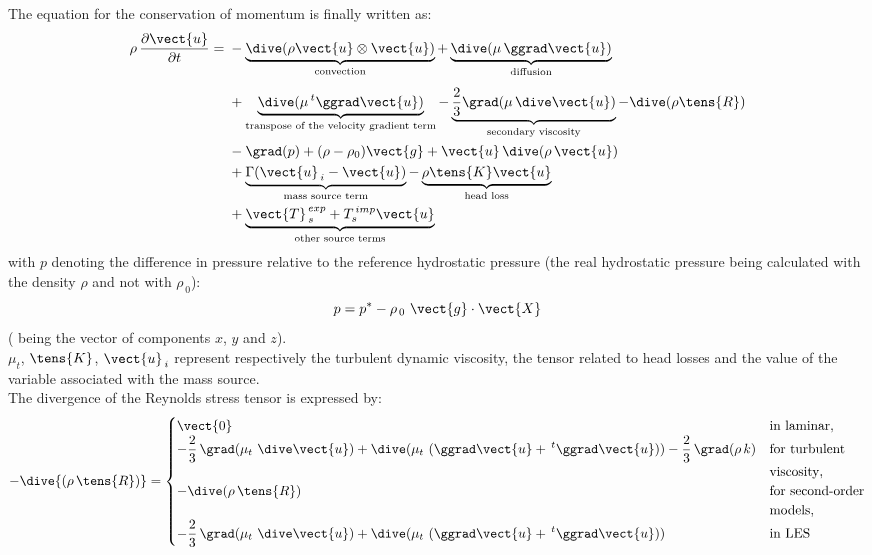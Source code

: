 The equation for the conservation of momentum is finally written as:
\begin{equation}
\begin{aligned}
\rho\,\frac{\partial \vect{u}}{\partial t}
={}&
-\underbrace{\dive(\rho \vect{u} \otimes \vect{u})}_{\text{convection}}
+\underbrace{\dive(\mu\,\ggrad \vect{u})}_{\text{diffusion}}
\\[1ex]
&+\underbrace{\dive(\mu\,{}^t\ggrad \vect{u})}_{\text{transpose of the velocity gradient term}}
-\underbrace{\frac{2}{3}\grad(\mu\,\dive\vect{u})}_{\text{secondary viscosity}}
-\dive(\rho\tens{R})
\\
&-\grad(p)+(\rho-\rho_0)\vect{g}
+\vect{u}\,\dive(\rho\,\vect{u})
\\
&+\underbrace{\Gamma(\vect{u}_{\,i}-\vect{u})}_{\text{mass source term}}
-\underbrace{\rho\tens{K}\vect{u}}_{\text{head loss}}
\\
&+\underbrace{\vect{T}_{\,s}^{\,exp}
+T_{s}^{\,imp}\vect{u}}_{\text{other source terms}}
\end{aligned}
\label{Base_Predvv_eqqdm}
\end{equation}
with $p$ denoting the difference in pressure relative to the reference hydrostatic
pressure (the real hydrostatic pressure being calculated with the density
$\rho$ and not with $\rho_{\,0}$):
\begin{equation}
p=p^*-\rho_{\,0}\ \vect{g}\cdot\vect{X}
\end{equation}
( being the vector of components $x$, $y$ and $z$).\\
$\mu_t$, $\tens{K}$, $\vect{u}_{\,i}$ represent respectively
the turbulent dynamic viscosity, the tensor related to head losses and the value of the
variable associated with the mass source.\\
The divergence of the Reynolds stress tensor is expressed by:
\begin{equation}
-\dive{(\rho\,\tens{R})}=
\begin{cases}
\vect{0} & \text{in laminar}, \\
 -\displaystyle\frac {2} {3}\, \grad (\mu_t\ \dive \vect {u})+\dive (\mu_t\ (\ggrad \vect {u}+ \,^t\ggrad \vect {u}))-\frac {2}{3}\,\grad (\rho\, k) & \text{for turbulent}\\
 & \text{viscosity}, \\
 -\dive(\rho\,\tens{R})& \text{for second-order}\\
 & \text{models},\\
-\displaystyle\frac {2} {3}\, \grad (\mu_t\ \dive \vect {u})+\dive (\mu_t\ (\ggrad \vect {u}+ \,^t\ggrad \vect {u})) & \text{in  LES}\\
\end{cases}
\end{equation}
